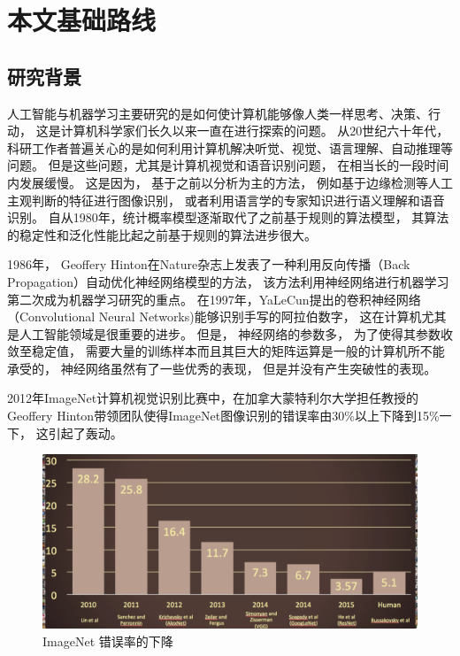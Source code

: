 

\chapter{本文基础路线}

\section{研究背景}

人工智能与机器学习主要研究的是如何使计算机能够像人类一样思考、决策、行动， 这是计算机科学家们长久以来一直在进行探索的问题。\cite{AIMD} 从20世纪六十年代， 科研工作者普遍关心的是如何利用计算机解决听觉、视觉、语言理解、自动推理等问题。 但是这些问题，尤其是计算机视觉和语音识别问题， 在相当长的一段时间内发展缓慢。 这是因为， 基于之前以分析为主的方法， 例如基于边缘检测等人工主观判断的特征进行图像识别， 或者利用语言学的专家知识进行语义理解和语音识别。 自从1980年，统计概率模型逐渐取代了之前基于规则的算法模型， 其算法的稳定性和泛化性能比起之前基于规则的算法进步很大。 \cite{50_years_ai} \cite{manning2008introduction} \cite{abelson1985structure}

1986年， Geoffery Hinton在Nature杂志上发表了一种利用反向传播（Back Propagation）自动优化神经网络模型的方法， 该方法利用神经网络进行机器学习第二次成为机器学习研究的重点。 在1997年，YaLeCun提出的卷积神经网络（Convolutional Neural Networks)能够识别手写的阿拉伯数字， 这在计算机尤其是人工智能领域是很重要的进步。 但是， 神经网络的参数多， 为了使得其参数收敛至稳定值， 需要大量的训练样本而且其巨大的矩阵运算是一般的计算机所不能承受的， 神经网络虽然有了一些优秀的表现， 但是并没有产生突破性的表现。 

2012年ImageNet计算机视觉识别比赛中，在加拿大蒙特利尔大学担任教授的Geoffery Hinton带领团队使得ImageNet图像识别的错误率由30\%以上下降到15\%一下， 这引起了轰动。 \cite{DBLP:journals/corr/abs-1301-3781} 
\begin{figure}[htbp]
    \centering  %
    \includegraphics[width = .85\linewidth]{data/chapter-2/image_net_rank.png} %
    \caption{ImageNet 错误率的下降} %
    \label{Russakovsky et al. arXiv, 2014} %
\end{figure}


